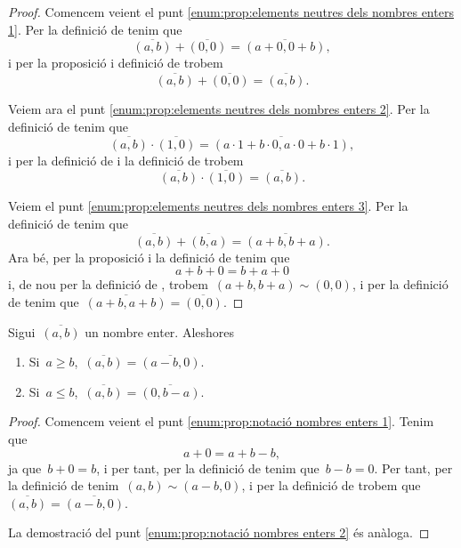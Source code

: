 \documentclass[../../main.tex]{subfiles}
\begin{document}
    \begin{proof}
        Comencem veient el punt \eqref{enum:prop:elements neutres dels nombres enters 1}.
        Per la definició de  tenim que
        \[
            \overline{(a,b)}+\overline{(0,0)}=\overline{(a+0,0+b)},
        \]
        i per la proposició  i definició de   trobem
        \[
            \overline{(a,b)}+\overline{(0,0)}=\overline{(a,b)}.
        \]

        Veiem ara el punt \eqref{enum:prop:elements neutres dels nombres enters 2}.
        Per la definició de  tenim que
        \[
            \overline{(a,b)}\cdot\overline{(1,0)}=\overline{(a\cdot 1+b\cdot 0,a\cdot0+b\cdot1)},
        \]
        i per la definició de  i la definició de  trobem
        \[
            \overline{(a,b)}\cdot\overline{(1,0)}=\overline{(a,b)}.
        \]

        Veiem el punt \eqref{enum:prop:elements neutres dels nombres enters 3}.
        Per la definició de  tenim que
        \[
            \overline{(a,b)}+\overline{(b,a)}=\overline{(a+b,b+a)}.
        \]
        Ara bé, per la proposició  i la definició de  tenim que
        \[
            a+b+0=b+a+0
        \]
        i, de nou per la definició de , trobem~\((a+b,b+a)\sim(0,0)\), i per la definició de  tenim que~\(\overline{(a+b,a+b)}=\overline{(0,0)}\).
    \end{proof}
    \begin{proposition}
        \label{prop:notació nombres enters}
        Sigui~\(\overline{(a,b)}\) un nombre enter.
        Aleshores
        \begin{enumerate}
            \item\label{enum:prop:notació nombres enters 1} Si~\(a\geq b\),~\(\overline{(a,b)}=\overline{(a-b,0)}\).
            \item\label{enum:prop:notació nombres enters 2} Si~\(a\leq b\),~\(\overline{(a,b)}=\overline{(0,b-a)}\).
        \end{enumerate}
    \end{proposition}
    \begin{proof}
        Comencem veient el punt \eqref{enum:prop:notació nombres enters 1}.
        Tenim que
        \[
            a+0=a+b-b,
        \]
        ja que~\(b+0=b\), i per tant, per la definició de  tenim que~\(b-b=0\).
        Per tant, per la definició de  tenim~\((a,b)\sim(a-b,0)\), i per la definició de  trobem que~\(\overline{(a,b)}=\overline{(a-b,0)}\).

        La demostració del punt \eqref{enum:prop:notació nombres enters 2} és anàloga.
    \end{proof}
\end{document}
